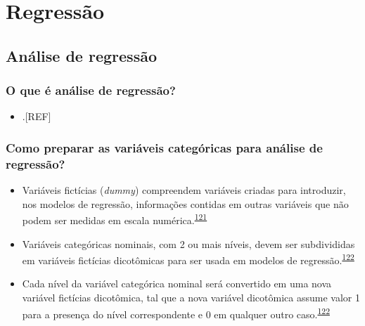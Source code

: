 \documentclass[
]{book}
\providecommand{\tightlist}{%
  \setlength{\itemsep}{0pt}\setlength{\parskip}{0pt}}
\begin{document}
\hypertarget{analise-inferencial-regressao}{%
\chapter{\texorpdfstring{\textbf{Regressão}}{Regressão}}\label{analise-inferencial-regressao}}

\hypertarget{analise-regressao}{%
\section{Análise de regressão}\label{analise-regressao}}

\hypertarget{o-que-uxe9-anuxe1lise-de-regressuxe3o}{%
\subsection{O que é análise de regressão?}\label{o-que-uxe9-anuxe1lise-de-regressuxe3o}}

\begin{itemize}
\tightlist
\item
  .{[}REF{]}
\end{itemize}

\hypertarget{como-preparar-as-variuxe1veis-categuxf3ricas-para-anuxe1lise-de-regressuxe3o}{%
\subsection{Como preparar as variáveis categóricas para análise de regressão?}\label{como-preparar-as-variuxe1veis-categuxf3ricas-para-anuxe1lise-de-regressuxe3o}}

\begin{itemize}
\item
  Variáveis fictícias (\emph{dummy}) compreendem variáveis criadas para introduzir, nos modelos de regressão, informações contidas em outras variáveis que não podem ser medidas em escala numérica.\textsuperscript{\protect\hyperlink{ref-suits1957}{121}}
\item
  Variáveis categóricas nominais, com 2 ou mais níveis, devem ser subdivididas em variáveis fictícias dicotômicas para ser usada em modelos de regressão.\textsuperscript{\protect\hyperlink{ref-Healy1995}{122}}
\item
  Cada nível da variável categórica nominal será convertido em uma nova variável fictícias dicotômica, tal que a nova variável dicotômica assume valor 1 para a presença do nível correspondente e 0 em qualquer outro caso.\textsuperscript{\protect\hyperlink{ref-Healy1995}{122}}
\end{itemize}
\end{document}
